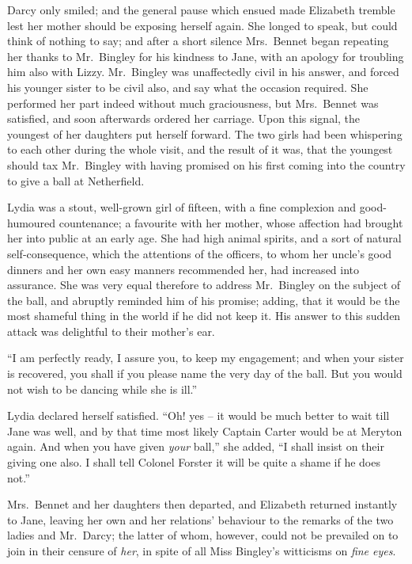 Darcy only smiled; and the general pause which ensued
made Elizabeth tremble lest her mother should be exposing
herself again. She longed to speak, but could think of
nothing to say; and after a short silence Mrs.\ Bennet
began repeating her thanks to Mr.\ Bingley for his kindness
to Jane, with an apology for troubling him also with
Lizzy. Mr.\ Bingley was unaffectedly civil in his answer,
and forced his younger sister to be civil also, and say what
the occasion required. She performed her part indeed
without much graciousness, but Mrs.\ Bennet was satisfied,
and soon afterwards ordered her carriage. Upon this
signal, the youngest of her daughters put herself forward.
The two girls had been whispering to each other during
the whole visit, and the result of it was, that the youngest
should tax Mr.\ Bingley with having promised on his first
coming into the country to give a ball at Netherfield.

Lydia was a stout, well-grown girl of fifteen, with a fine
complexion and good-humoured countenance; a favourite
with her mother, whose affection had brought her into
public at an early age. She had high animal spirits, and
a sort of natural self-consequence, which the attentions
of the officers, to whom her uncle’s good dinners and
her own easy manners recommended her, had increased
into assurance. She was very equal therefore to address
Mr.\ Bingley on the subject of the ball, and abruptly
reminded him of his promise; adding, that it would be
the most shameful thing in the world if he did not keep it.
His answer to this sudden attack was delightful to their
mother’s ear.

“I am perfectly ready, I assure you, to keep my engagement;
and when your sister is recovered, you shall if you
please name the very day of the ball. But you would not
wish to be dancing while she is ill.”

Lydia declared herself satisfied. “Oh! yes -- it would
be much better to wait till Jane was well, and by that time
most likely Captain Carter would be at Meryton again.
And when you have given \textit{your} ball,” she added, “I shall
insist on their giving one also. I shall tell Colonel Forster
it will be quite a shame if he does not.”

Mrs.\ Bennet and her daughters then departed, and
Elizabeth returned instantly to Jane, leaving her own
and her relations’ behaviour to the remarks of the two
ladies and Mr.\ Darcy; the latter of whom, however,
could not be prevailed on to join in their censure of \textit{her},
in spite of all Miss Bingley’s witticisms on \textit{fine eyes}.


